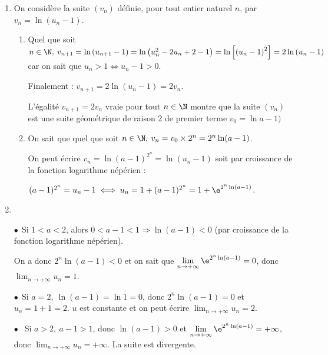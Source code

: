 \begin{enumerate}
\item On considère la suite $\left(v_n\right)$ définie, pour tout entier naturel $n$, par $v_n = \ln \left(u_n - 1\right)$.
	\begin{enumerate}
		\item %
Quel que soit $n \in \N, \: v_{n+1} = \ln \left(u_{n+1} - 1\right) = \ln \left(u_n^2 - 2u_n + 2 - 1\right) = \ln \left[\left(u_n - 1\right)^2\right] = 2\ln \left(u_n - 1\right)$ car on sait que $u_n > 1 \iff u_n - 1 > 0$.

Finalement : $v_{n+1} = 2\ln \left(u_n - 1\right) = 2v_n$.

L'égalité $v_{n+1} = 2v_n$ vraie pour tout $n \in \N$ montre que la suite $\left(v_n\right)$ est une suite géométrique de raison 2 de premier terme $v_0 = \ln a - 1)$
		\item %
On sait que quel que soit $n \in \N, \: v_n = v_0 \times 2^n = 2^n\ln (a - 1)$.

On peut écrire  $v_n = \ln (a - 1)^{2^n} = \ln \left(u_n - 1\right)$ soit par croissance de la fonction logarithme népérien :

$(a - 1)^{2^n} = u_n - 1 \iff u_n = 1 + (a - 1)^{2^n} = 1 + \e^{2^n \ln (a - 1)}$.
	\end{enumerate}
\item ~%

$\bullet~~$Si $1 < a < 2$, alors $0 < a - 1 < 1 \Rightarrow \ln (a - 1) < 0$ (par croissance de la fonction logarithme népérien).

On a donc $2^n \ln (a - 1) < 0$ et on sait que $\displaystyle\lim_{n \to + \infty} \e^{2^n \ln (a - 1)} = 0$, donc $\displaystyle\lim_{n \to + \infty}u_n = 1$.

$\bullet~~$Si $a = 2, \: \ln (a - 1) = \ln 1 = 0$, donc $2^n \ln (a - 1) = 0$ et $u_n = 1 + 1 = 2$. $u$ est constante et on peut écrire $\displaystyle\lim_{n \to + \infty}u_n = 2$.

$\bullet~~$ Si $a > 2, \: a - 1 > 1$, donc $\ln (a - 1) > 0$ et $\displaystyle\lim_{n \to + \infty} \e^{2^n \ln (a - 1)} = + \infty$, donc $\displaystyle\lim_{n \to + \infty}u_n = + \infty$. La suite est divergente.
\end{enumerate}

\bigskip

